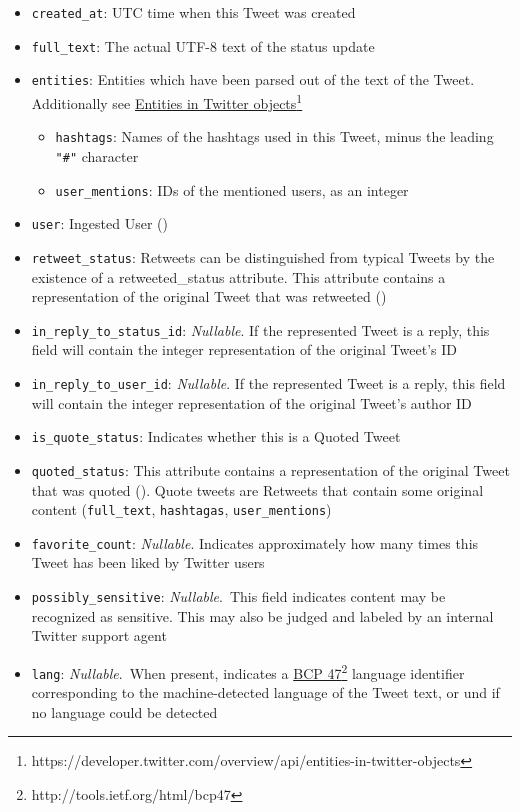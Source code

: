 \begin{itemize}
    \item \texttt{created\_at}: UTC time when this Tweet was created
    \item \texttt{full\_text}: The actual UTF-8 text of the status update
    \item \texttt{entities}: Entities which have been parsed out of the text of the Tweet. Additionally see \href{https://developer.twitter.com/overview/api/entities-in-twitter-objects}{Entities in Twitter objects}\footnote{https://developer.twitter.com/overview/api/entities-in-twitter-objects}
        \begin{itemize}
        \item \texttt{hashtags}: Names of the hashtags used in this Tweet, minus the leading \texttt{"\#"} character
        \item \texttt{user\_mentions}: IDs of the mentioned users, as an integer
        \end{itemize}
    \item \texttt{user}: Ingested User ()
    \item \texttt{retweet\_status}: Retweets can be distinguished from typical Tweets by the existence of a retweeted\_status attribute. This attribute contains a representation of the original Tweet that was retweeted ()
    \item \texttt{in\_reply\_to\_status\_id}: \textit{Nullable}. If the represented Tweet is a reply, this field will contain the integer representation of the original Tweet's ID
    \item \texttt{in\_reply\_to\_user\_id}: \textit{Nullable}. If the represented Tweet is a reply, this field will contain the integer representation of the original Tweet's author ID
    \item \texttt{is\_quote\_status}: Indicates whether this is a Quoted Tweet
    \item \texttt{quoted\_status}: This attribute contains a representation of the original Tweet that was quoted (). Quote tweets are Retweets that contain some original content (\texttt{full\_text}, \texttt{hashtagas}, \texttt{user\_mentions})  
    \item \texttt{favorite\_count}: \textit{Nullable}. Indicates approximately how many times this Tweet has been liked by Twitter users
    \item \texttt{possibly\_sensitive}: \textit{Nullable}. This field indicates content may be recognized as sensitive. This may also be judged and labeled by an internal Twitter support agent
    \item \texttt{lang}: \textit{Nullable}. When present, indicates a \href{http://tools.ietf.org/html/bcp47}{BCP 47}\footnote{http://tools.ietf.org/html/bcp47} language identifier corresponding to the machine-detected language of the Tweet text, or und if no language could be detected
\end{itemize}

